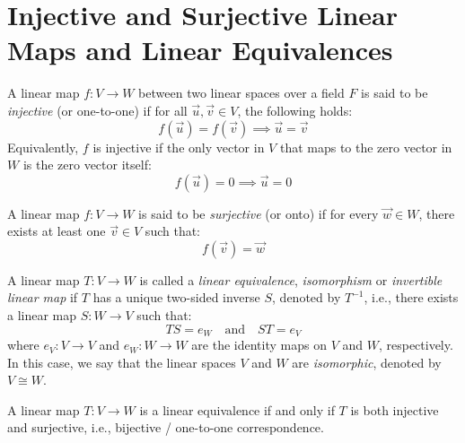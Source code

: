 \documentclass[11pt,fleqn]{book} %
\begin{document}
\newpage

\section{Injective and Surjective Linear Maps and Linear Equivalences}

\begin{definition}
    A linear map $f: V \to W$ between two linear spaces over a field $F$ is said to be \emph{injective} (or one-to-one) if for all $\vec{u}, \vec{v} \in V$, the following holds:
    \[
        f(\vec{u}) = f(\vec{v}) \implies \vec{u} = \vec{v}
    \]
    Equivalently, $f$ is injective if the only vector in $V$ that maps to the zero vector in $W$ is the zero vector itself:
    \[
        f(\vec{u}) = 0 \implies \vec{u} = 0
    \]
\end{definition}

\begin{definition}
    A linear map $f: V \to W$ is said to be \emph{surjective} (or onto) if for every $\vec{w} \in W$, there exists at least one $\vec{v} \in V$ such that:
    \[
        f(\vec{v}) = \vec{w}
    \]
\end{definition}

\begin{definition}
    A linear map $T: V \to W$ is called a \emph{linear equivalence}, \emph{isomorphism} or \emph{invertible linear map} if $T$ has a unique two-sided inverse $S$, denoted by $T^{-1}$, i.e., there exists a linear map $S: W \to V$ such that:
    \[
        TS = e_W \quad \text{and} \quad ST = e_V
    \]
    where $e_V: V \to V$ and $e_W: W \to W$ are the identity maps on $V$ and $W$, respectively.
    In this case, we say that the linear spaces $V$ and $W$ are \emph{isomorphic}, denoted by $V \cong W$.
\end{definition}

\begin{corollary}
    A linear map $T: V \to W$ is a linear equivalence if and only if $T$ is both injective and surjective, i.e., bijective / one-to-one correspondence.
\end{corollary}
\end{document}
